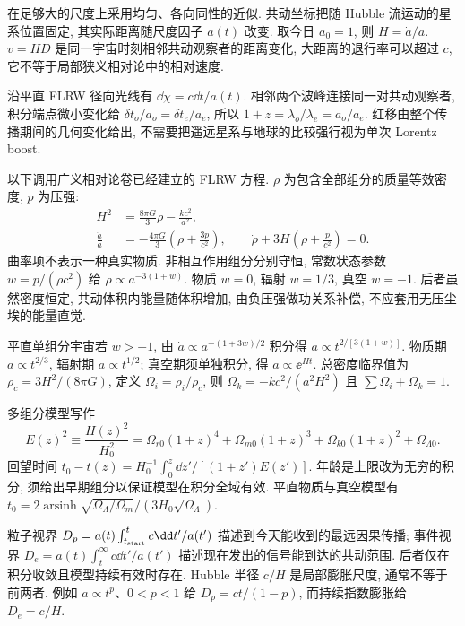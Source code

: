 \label{ch:cosmo}
在足够大的尺度上采用均匀、各向同性的近似. 共动坐标把随 Hubble 流运动的星系位置固定, 其实际距离随尺度因子 $a(t)$ 改变. 取今日 $a_0=1$, 则 $H=\dot a/a$. $v=HD$ 是同一宇宙时刻相邻共动观察者的距离变化, 大距离的退行率可以超过 $c$, 它不等于局部狭义相对论中的相对速度.

沿平直 FLRW 径向光线有 $\dd\chi=c\dd t/a(t)$. 相邻两个波峰连接同一对共动观察者, 积分端点微小变化给 $\delta t_o/a_o=\delta t_e/a_e$, 所以 $1+z=\lambda_o/\lambda_e=a_o/a_e$. 红移由整个传播期间的几何变化给出, 不需要把遥远星系与地球的比较强行视为单次 Lorentz boost.

以下调用广义相对论卷已经建立的 FLRW 方程. $\rho$ 为包含全部组分的质量等效密度, $p$ 为压强:
\begin{align}
H^2&=\frac{8\pi G}3\rho-\frac{kc^2}{a^2},\label{eq:friedmann}\\
\frac{\ddot a}a&=-\frac{4\pi G}3\left(\rho+\frac{3p}{c^2}\right),\qquad
\dot\rho+3H\left(\rho+\frac p{c^2}\right)=0.\label{eq:conservation}
\end{align}
曲率项不表示一种真实物质. 非相互作用组分分别守恒, 常数状态参数 $w=p/(\rho c^2)$ 给 $\rho\propto a^{-3(1+w)}$. 物质 $w=0$, 辐射 $w=1/3$, 真空 $w=-1$. 后者虽然密度恒定, 共动体积内能量随体积增加, 由负压强做功关系补偿, 不应套用无压尘埃的能量直觉.

平直单组分宇宙若 $w>-1$, 由 $\dot a\propto a^{-(1+3w)/2}$ 积分得 $a\propto t^{2/[3(1+w)]}$. 物质期 $a\propto t^{2/3}$, 辐射期 $a\propto t^{1/2}$; 真空期须单独积分, 得 $a\propto\ee^{Ht}$. 总密度临界值为 $\rho_c=3H^2/(8\pi G)$, 定义 $\Omega_i=\rho_i/\rho_c$, 则 $\Omega_k=-kc^2/(a^2H^2)$ 且 $\sum\Omega_i+\Omega_k=1$.

多组分模型写作
\begin{equation}\label{eq:Hz}
E(z)^2\equiv\frac{H(z)^2}{H_0^2}
=\Omega_{r0}(1+z)^4+\Omega_{m0}(1+z)^3
+\Omega_{k0}(1+z)^2+\Omega_{\Lambda0}.
\end{equation}
回望时间 $t_0-t(z)=H_0^{-1}\int_0^z\dd z'/[(1+z')E(z')]$. 年龄是上限改为无穷的积分, 须给出早期组分以保证模型在积分全域有效. 平直物质与真空模型有 $t_0=2\operatorname{arsinh}\sqrt{\Omega_\Lambda/\Omega_m}/(3H_0\sqrt{\Omega_\Lambda})$.

粒子视界 $D_p=a(t)\int_{t_{\rm start}}^t c\dd t'/a(t')$ 描述到今天能收到的最远因果传播; 事件视界 $D_e=a(t)\int_t^\infty c\dd t'/a(t')$ 描述现在发出的信号能到达的共动范围. 后者仅在积分收敛且模型持续有效时存在. Hubble 半径 $c/H$ 是局部膨胀尺度, 通常不等于前两者. 例如 $a\propto t^p$、$0<p<1$ 给 $D_p=ct/(1-p)$, 而持续指数膨胀给 $D_e=c/H$.
